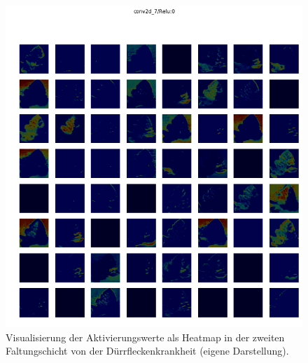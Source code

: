 \begin{figure}[h!]
	\centering
	\includegraphics[width=\textwidth]{visualisierungen/early/heatmap_mit/conv2d_7.png}
	\caption{Visualisierung der Aktivierungswerte als Heatmap in der zweiten Faltungschicht von der Dürrfleckenkrankheit (eigene Darstellung).}
	\label{}
\end{figure}


